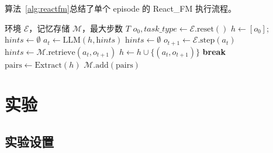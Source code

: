 \documentclass[11pt,a4paper]{article}
\newcommand{\method}{React\_FM}
\begin{document}
算法~\ref{alg:reactfm}总结了单个 episode 的 \method{} 执行流程。

\begin{algorithm}[t]
\caption{\method{} Episode 执行}
\label{alg:reactfm}
\begin{algorithmic}[1]
\REQUIRE 环境 $\mathcal{E}$，记忆存储 $\mathcal{M}$，最大步数 $T$
\STATE $o_0, \textit{task\_type} \leftarrow \mathcal{E}.\text{reset}()$
\STATE $h \leftarrow [o_0]$; $\textit{hints} \leftarrow \emptyset$
    \STATE $a_t \leftarrow \text{LLM}(h, \textit{hints})$ 
    \STATE $\textit{hints} \leftarrow \emptyset$ 
    \STATE $o_{t+1} \leftarrow \mathcal{E}.\text{step}(a_t)$
        \STATE $\textit{hints} \leftarrow \mathcal{M}.\text{retrieve}(a_t, o_{t+1})$ 
    \ENDIF
    \STATE $h \leftarrow h \cup \{(a_t, o_{t+1})\}$
        \STATE \textbf{break}
    \ENDIF
\ENDFOR
\STATE $\text{pairs} \leftarrow \text{Extract}(h)$ 
\STATE $\mathcal{M}.\text{add}(\text{pairs})$ 
\end{algorithmic}
\end{algorithm}

\section{实验}

\subsection{实验设置}
\end{document}
